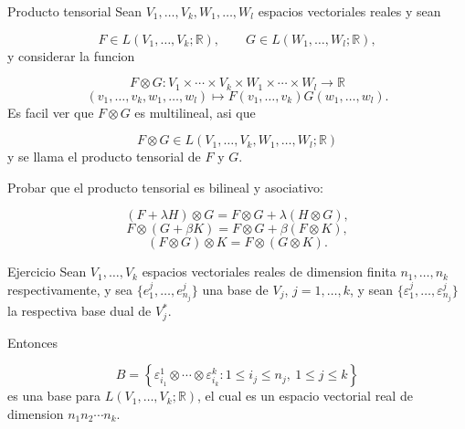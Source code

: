 \begin{bookdefinition}{Producto tensorial}
Sean $V_1,\ldots,V_k,W_1,\ldots,W_l$ espacios vectoriales reales y sean

\[
F\in L(V_1,\ldots,V_k;\mathbb R),\qquad G\in L(W_1,\ldots,W_l;\mathbb R),
\]
y considerar la funcion

\[
F\otimes G:V_1\times\cdots\times V_k\times W_1\times\cdots\times W_l\to\mathbb R
\]
\[
(v_1,\ldots,v_k,w_1,\ldots,w_l)\mapsto F(v_1,\ldots,v_k)G(w_1,\ldots,w_l).
\]
Es facil ver que $F\otimes G$ es multilineal, asi que

\[
F\otimes G\in L(V_1,\ldots,V_k,W_1,\ldots,W_l;\mathbb R)
\]
y se llama el producto tensorial de $F$ y $G$.

\end{bookdefinition}
\label{blk:db8d92}
\begin{bookexercise}{}
Probar que el producto tensorial es bilineal y asociativo:

\[
(F+\lambda H)\otimes G=F\otimes G+\lambda(H\otimes G),
\]
\[
F\otimes(G+\beta K)=F\otimes G+\beta(F\otimes K),
\]
\[
(F\otimes G)\otimes K=F\otimes(G\otimes K).
\]
\end{bookexercise}
\begin{bookproposition}{Ejercicio}
Sean $V_1,\ldots,V_k$ espacios vectoriales reales de dimension finita $n_1,\ldots,n_k$ respectivamente, y sea $\{e^j_1,\ldots,e^j_{n_j}\}$ una base de $V_j$, $j=1,\ldots,k$, y sean $\{\varepsilon^j_1,\ldots,\varepsilon^j_{n_j}\}$ la respectiva base dual de $V_j^*$.

Entonces

\[
B=\left\{\varepsilon^1_{i_1}\otimes\cdots\otimes\varepsilon^k_{i_k}:1\le i_j\le n_j,\ 1\le j\le k\right\}
\]
es una base para $L(V_1,\ldots,V_k;\mathbb R)$, el cual es un espacio vectorial real de dimension $n_1n_2\cdots n_k$.

\end{bookproposition}
